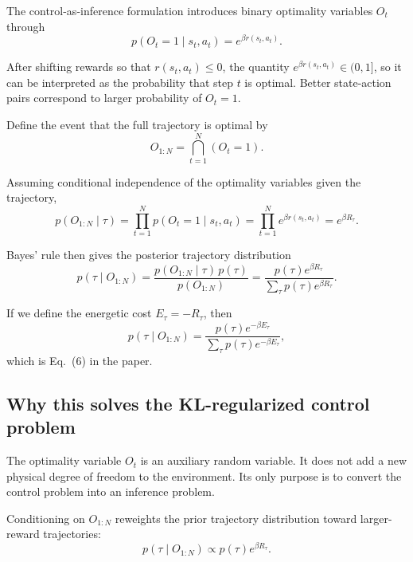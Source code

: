 \documentclass[11pt]{article}
\begin{document}
The control-as-inference formulation introduces binary optimality variables \(O_t\) through
\begin{equation}
    p(O_t=1\mid s_t,a_t) = e^{\beta r(s_t,a_t)}.
\end{equation}

After shifting rewards so that \(r(s_t,a_t)\le 0\), the quantity
\(e^{\beta r(s_t,a_t)}\in (0,1]\), so it can be interpreted as the probability that step
\(t\) is optimal. Better state-action pairs correspond to larger probability of \(O_t=1\).

Define the event that the full trajectory is optimal by
\begin{equation}
    O_{1:N} = \bigcap_{t=1}^{N}(O_t=1).
\end{equation}

Assuming conditional independence of the optimality variables given the trajectory,
\begin{equation}
    p(O_{1:N}\mid \tau)
    = \prod_{t=1}^{N} p(O_t=1\mid s_t,a_t)
    = \prod_{t=1}^{N} e^{\beta r(s_t,a_t)}
    = e^{\beta R_\tau}.
\end{equation}

Bayes' rule then gives the posterior trajectory distribution
\begin{equation}
    p(\tau\mid O_{1:N})
    = \frac{p(O_{1:N}\mid \tau)\,p(\tau)}{p(O_{1:N})}
    = \frac{p(\tau)e^{\beta R_\tau}}{\sum_{\tau} p(\tau)e^{\beta R_\tau}}.
\end{equation}

If we define the energetic cost \(E_\tau=-R_\tau\), then
\begin{equation}
    p(\tau\mid O_{1:N})
    = \frac{p(\tau)e^{-\beta E_\tau}}{\sum_{\tau} p(\tau)e^{-\beta E_\tau}},
\end{equation}
which is Eq.~(6) in the paper.

\subsection*{Why this solves the KL-regularized control problem}

The optimality variable \(O_t\) is an auxiliary random variable. It does not add a new
physical degree of freedom to the environment. Its only purpose is to convert the control
problem into an inference problem.

Conditioning on \(O_{1:N}\) reweights the prior trajectory distribution toward larger-reward
trajectories:
\begin{equation}
    p(\tau\mid O_{1:N}) \propto p(\tau)e^{\beta R_\tau}.
\end{equation}
\end{document}
